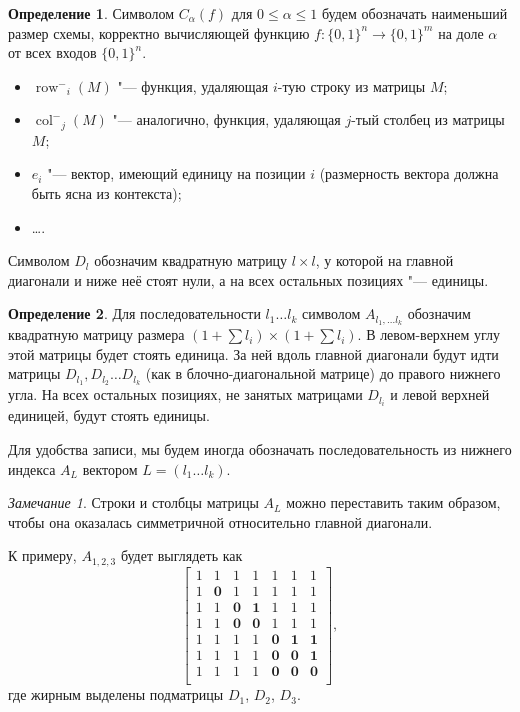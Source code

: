 \documentclass[oneside, a4paper]{article}
\theoremstyle{definition}
\newtheorem{definition}{Определение}
\theoremstyle{remark}
\newtheorem{remark}{Замечание}
\newcommand\rowm{\ensuremath{\operatorname{row}^-}}
\newcommand\colm{\ensuremath{\operatorname{col}^-}}
\begin{document}
\begin{definition}
Символом $C_\alpha(f)$ для $0 \leq \alpha \leq 1$ будем обозначать наименьший
размер схемы, корректно вычисляющей функцию $f : \{0, 1\}^n \to \{0, 1\}^m$ на
доле $\alpha$ от всех входов $\{0, 1\}^n$.
\end{definition}

\begin{itemize}
\item $\rowm_i(M)$ "--- функция, удаляющая $i$-тую строку из матрицы $M$;
\item $\colm_j(M)$ "--- аналогично, функция, удаляющая $j$-тый столбец из матрицы $M$;
\item $e_i$ "--- вектор, имеющий единицу на позиции $i$ (размерность вектора
должна быть ясна из контекста);
\item \dots.
\end{itemize}

Символом $D_l$ обозначим квадратную матрицу $l \times l$, у которой на главной
диагонали и ниже неё стоят нули, а на всех остальных позициях "--- единицы.

\begin{definition}
Для последовательности $l_1 \dots l_k$ символом $A_{l_1, \dots l_k}$ обозначим
квадратную матрицу размера $(1 + \sum l_i) \times (1 + \sum l_i)$. В левом-верхнем
углу этой матрицы будет стоять единица. За ней вдоль главной диагонали будут идти
матрицы $D_{l_1}, D_{l_2} \dots D_{l_k}$ (как в блочно-диагональной матрице) до
правого нижнего угла. На всех остальных позициях, не занятых матрицами $D_{l_i}$
и левой верхней единицей, будут стоять единицы.
\end{definition}

Для удобства записи, мы будем иногда обозначать последовательность из нижнего
индекса $A_L$ вектором $L = (l_1 \dots l_k)$.

\begin{remark}
Строки и столбцы матрицы $A_L$ можно переставить таким образом, чтобы она
оказалась симметричной относительно главной диагонали.
\end{remark}

К примеру, $A_{1, 2, 3}$ будет выглядеть как
\[
\begin{bmatrix}
1 & 1 & 1 & 1 & 1 & 1 & 1 \\
1 & \mathbf{0} & 1 & 1 & 1 & 1 & 1 \\
1 & 1 & \mathbf{0} & \mathbf{1} & 1 & 1 & 1 \\
1 & 1 & \mathbf{0} & \mathbf{0} & 1 & 1 & 1 \\
1 & 1 & 1 & 1 & \mathbf{0} & \mathbf{1} & \mathbf{1} \\
1 & 1 & 1 & 1 & \mathbf{0} & \mathbf{0} & \mathbf{1} \\
1 & 1 & 1 & 1 & \mathbf{0} & \mathbf{0} & \mathbf{0} \\
\end{bmatrix},
\]
где жирным выделены подматрицы $D_1$, $D_2$, $D_3$.
\end{document}

